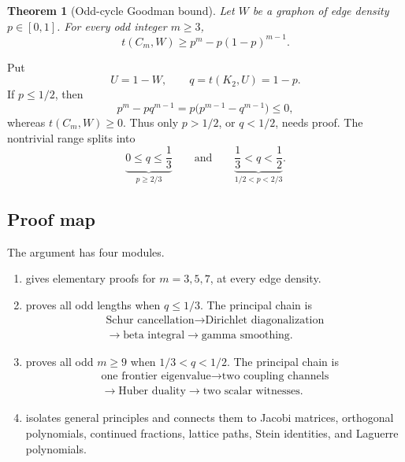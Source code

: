 \documentclass[11pt]{article}
\newtheorem{theorem}{Theorem}[section]
\begin{document}
\begin{theorem}[Odd-cycle Goodman bound]\label{thm:main}
Let \(W\) be a graphon of edge density \(p\in[0,1]\).  For every odd integer
\(m\ge3\),
\begin{equation}\label{eq:main-goal}
       t(C_m,W)\ge p^m-p(1-p)^{m-1}.
\end{equation}
\end{theorem}

Put
\[
       U=1-W,\qquad q=t(K_2,U)=1-p.
\]
If \(p\le1/2\), then
\[
 p^m-pq^{m-1}=p\bigl(p^{m-1}-q^{m-1}\bigr)\le0,
\]
whereas \(t(C_m,W)\ge0\).  Thus only \(p>1/2\), or \(q<1/2\), needs proof.
The nontrivial range splits into
\[
 \underbrace{0\le q\le\frac13}_{p\ge2/3}
 \qquad\text{and}\qquad
 \underbrace{\frac13<q<\frac12}_{1/2<p<2/3}.
\]

\subsection{Proof map}

The argument has four modules.

\begin{enumerate}[label=\textbf{Module \arabic*.},leftmargin=3.4em]
\item {} gives elementary proofs for \(m=3,5,7\), at
      every edge density.
\item {} proves all odd lengths when
      \(q\le1/3\).  The principal chain is
      \[
      \begin{gathered}
      \text{Schur cancellation}
      \longrightarrow \text{Dirichlet diagonalization}\\
      \longrightarrow \text{beta integral}
      \longrightarrow \text{gamma smoothing}.
      \end{gathered}
      \]
\item {}
      proves all odd \(m\ge9\) when \(1/3<q<1/2\).  The principal chain is
      \[
      \begin{gathered}
      \text{one frontier eigenvalue}
      \longrightarrow \text{two coupling channels}\\
      \longrightarrow \text{Huber duality}
      \longrightarrow \text{two scalar witnesses}.
      \end{gathered}
      \]
\item {} isolates general principles and connects them
      to Jacobi matrices, orthogonal polynomials, continued fractions,
      lattice paths, Stein identities, and Laguerre polynomials.
\end{enumerate}
\end{document}
